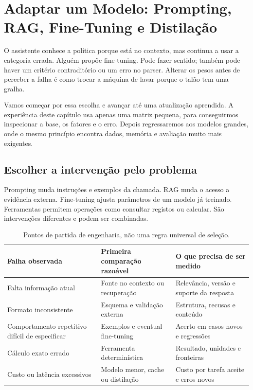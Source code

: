 \chapter{Adaptar um Modelo: Prompting, RAG, Fine-Tuning e Distilação}
\label{ch:adaptacao}

O assistente conhece a política porque está no contexto, mas continua a usar a categoria errada. Alguém propõe fine-tuning. Pode fazer sentido; também pode haver um critério contraditório ou um erro no parser. Alterar os pesos antes de perceber a falha é como trocar a máquina de lavar porque o talão tem uma gralha.

Vamos começar por essa escolha e avançar até uma atualização aprendida. A experiência deste capítulo usa apenas uma matriz pequena, para conseguirmos inspecionar a base, os fatores e o erro. Depois regressaremos aos modelos grandes, onde o mesmo princípio encontra dados, memória e avaliação muito mais exigentes.

\section{Escolher a intervenção pelo problema}
Prompting muda instruções e exemplos da chamada. RAG muda o acesso a evidência externa. Fine-tuning ajusta parâmetros de um modelo já treinado. Ferramentas permitem operações como consultar registos ou calcular. São intervenções diferentes e podem ser combinadas.

\begin{table}[htbp]
\small
\begin{tabularx}{\textwidth}{@{}*{3}{>{\raggedright\arraybackslash}X}@{}}
\toprule
Falha observada & Primeira comparação razoável & O que precisa de ser medido \\
\midrule
Falta informação atual & Fonte no contexto ou recuperação & Relevância, versão e suporte da resposta \\
Formato inconsistente & Esquema e validação externa & Estrutura, recusas e conteúdo \\
Comportamento repetitivo difícil de especificar & Exemplos e eventual fine-tuning & Acerto em casos novos e regressões \\
Cálculo exato errado & Ferramenta determinística & Resultado, unidades e fronteiras \\
Custo ou latência excessivos & Modelo menor, cache ou distilação & Custo por tarefa aceite e erros novos \\
\bottomrule
\end{tabularx}
\caption{Pontos de partida de engenharia, não uma regra universal de seleção.}
\end{table}

